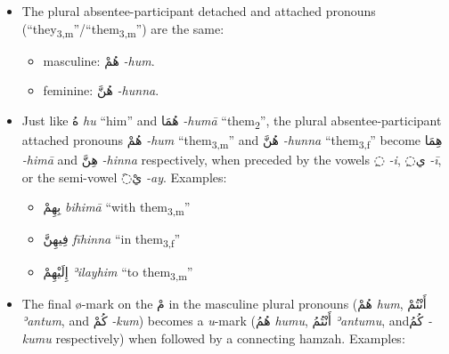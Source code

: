 \documentclass[
  10pt,
]{book}
\providecommand{\tightlist}{%
  \setlength{\itemsep}{0pt}\setlength{\parskip}{0pt}}
\begin{document}
\begin{itemize}
\tightlist
\item
  The plural absentee-participant detached and attached pronouns (\enquote{they\textsubscript{3,m}}/\enquote{them\textsubscript{3,m}}) are the same:

  \begin{itemize}
  \tightlist
  \item
    masculine: \foreignlanguage{arabic}{هُمْ} \emph{-hum}.
  \item
    feminine: \foreignlanguage{arabic}{هُنَّ} \emph{-hunna}.
  \end{itemize}
\item
  Just like \foreignlanguage{arabic}{هُ} \emph{hu} \enquote{him} and \foreignlanguage{arabic}{هُمَا} \emph{-humā} \enquote{them\textsubscript{2}}, the plural absentee-participant attached pronouns
  \foreignlanguage{arabic}{هُمْ} \emph{-hum} \enquote{them\textsubscript{3,m}} and
  \foreignlanguage{arabic}{هُنَّ} \emph{-hunna} \enquote{them\textsubscript{3,f}}
  become \foreignlanguage{arabic}{هِمَا} \emph{-himā} and \foreignlanguage{arabic}{هِنَّ} \emph{-hinna} respectively, when preceded by the vowels \foreignlanguage{arabic}{◌ِ} \emph{-i}, \foreignlanguage{arabic}{◌ِي} \emph{-ī}, or the semi-vowel \foreignlanguage{arabic}{◌َيْ} \emph{-ay}. Examples:

  \begin{itemize}
  \tightlist
  \item
    \foreignlanguage{arabic}{بِهِمْ} \emph{bihimā} \enquote{with them\textsubscript{3,m}}
  \item
    \foreignlanguage{arabic}{فِيهِنَّ} \emph{fīhinna} \enquote{in them\textsubscript{3,f}}
  \item
    \foreignlanguage{arabic}{إِلَيْهِمْ} \emph{ʾilayhim} \enquote{to them\textsubscript{3,m}}
  \end{itemize}
\item
  The final ø-mark on the \foreignlanguage{arabic}{مْ} in the masculine plural pronouns (\foreignlanguage{arabic}{هُمْ} \emph{hum}, \foreignlanguage{arabic}{أَنْتُمْ} \emph{ʾantum}, and \foreignlanguage{arabic}{کُمْ} \emph{-kum}) becomes a \emph{u}-mark (\foreignlanguage{arabic}{هُمُ} \emph{humu}, \foreignlanguage{arabic}{أَنْتُمُ} \emph{ʾantumu}, and\foreignlanguage{arabic}{کُمُ} \emph{-kumu} respectively) when followed by a connecting hamzah. Examples:


\end{itemize}
\end{document}
